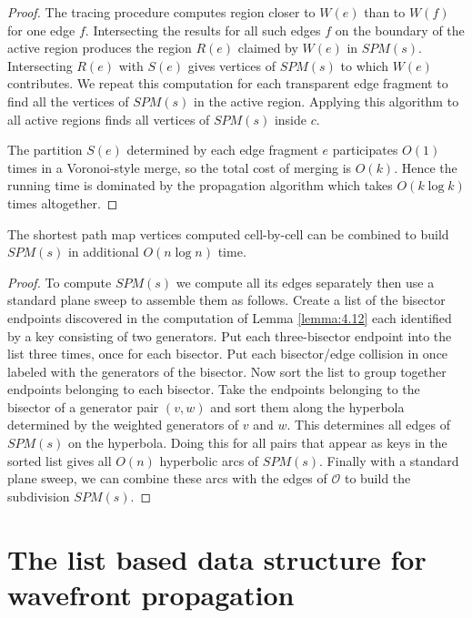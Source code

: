 \begin{proof}
    The tracing procedure computes region closer to
	$W(e)$ than to $W(f)$ for one edge $f$. Intersecting the results for all
	such edges $f$ on the boundary of the active region produces the region
	$R(e)$ claimed by $W(e)$ in $SPM(s)$. Intersecting $R(e)$ with $S(e)$ gives
	vertices of $SPM(s)$ to which $W(e)$ contributes. We repeat this computation
	for each transparent edge fragment to find all the vertices of $SPM(s)$ in
	the active region. Applying this algorithm to all active regions finds all
	vertices of $SPM(s)$ inside $c$.

	The partition $S(e)$ determined by each edge fragment $e$ participates $O(1)$
	times in a Voronoi-style merge, so the total cost of merging is $O(k)$.
	Hence the running time is dominated by the propagation algorithm which takes
	$O(k\log k)$ times altogether.
\end{proof}
\begin{Lemma} \label{lemma:4.13} 
	The shortest path map vertices computed cell-by-cell can be combined to
	build $SPM(s)$ in additional $O(n\log n)$	 time.
\end{Lemma}
\begin{proof}
	To compute $SPM(s)$ we compute all its edges separately then use a standard
	plane sweep to assemble them as follows. Create a list of the bisector
	endpoints discovered in the computation of Lemma \ref{lemma:4.12} each identified by a
	key consisting of two generators. Put each three-bisector endpoint into the
	list three times, once for each bisector. Put each bisector/edge collision
	in once labeled with the generators of the bisector. Now sort the list to
	group together endpoints belonging to each bisector. Take the endpoints
	belonging to the bisector of a generator pair $(v,w)$ and sort them along
	the hyperbola determined by the weighted generators of $v$ and $w$. This
	determines all edges of $SPM(s)$ on the hyperbola. Doing this for all pairs
	that appear as keys in the sorted list gives all $O(n)$ hyperbolic arcs of
	$SPM(s)$. Finally with a standard plane sweep, we can combine these arcs
	with the edges of $\mathcal{O}$ to build the subdivision $SPM(s)$.
\end{proof}

\section{The list based data structure for wavefront propagation} \label{section:datastructurewavefront}

